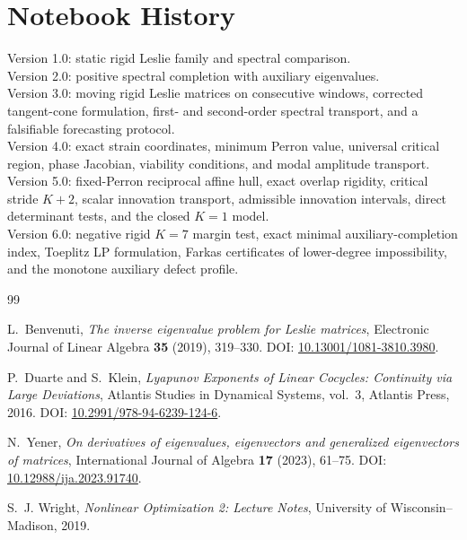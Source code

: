 \documentclass[11pt]{amsart}
\numberwithin{equation}{section}
\theoremstyle{plain}
\theoremstyle{definition}
\theoremstyle{remark}
\begin{document}
\section*{Notebook History}
Version 1.0: static rigid Leslie family and spectral comparison.\\
Version 2.0: positive spectral completion with auxiliary eigenvalues.\\
Version 3.0: moving rigid Leslie matrices on consecutive windows, corrected tangent-cone formulation, first- and second-order spectral transport, and a falsifiable forecasting protocol.\\
Version 4.0: exact strain coordinates, minimum Perron value, universal critical region, phase Jacobian, viability conditions, and modal amplitude transport.\\
Version 5.0: fixed-Perron reciprocal affine hull, exact overlap rigidity, critical stride $K+2$, scalar innovation transport, admissible innovation intervals, direct determinant tests, and the closed $K=1$ model.\\
Version 6.0: negative rigid $K=7$ margin test, exact minimal auxiliary-completion index, Toeplitz LP formulation, Farkas certificates of lower-degree impossibility, and the monotone auxiliary defect profile.

\begin{thebibliography}{99}

L.~Benvenuti,
\emph{The inverse eigenvalue problem for Leslie matrices},
Electronic Journal of Linear Algebra \textbf{35} (2019), 319--330.
DOI: \href{https://doi.org/10.13001/1081-3810.3980}{10.13001/1081-3810.3980}.

P.~Duarte and S.~Klein,
\emph{Lyapunov Exponents of Linear Cocycles: Continuity via Large Deviations},
Atlantis Studies in Dynamical Systems, vol.~3, Atlantis Press, 2016.
DOI: \href{https://doi.org/10.2991/978-94-6239-124-6}{10.2991/978-94-6239-124-6}.

N.~Yener,
\emph{On derivatives of eigenvalues, eigenvectors and generalized eigenvectors of matrices},
International Journal of Algebra \textbf{17} (2023), 61--75.
DOI: \href{https://doi.org/10.12988/ija.2023.91740}{10.12988/ija.2023.91740}.

S.~J. Wright,
\emph{Nonlinear Optimization 2: Lecture Notes},
University of Wisconsin--Madison, 2019.

\end{thebibliography}
\end{document}
